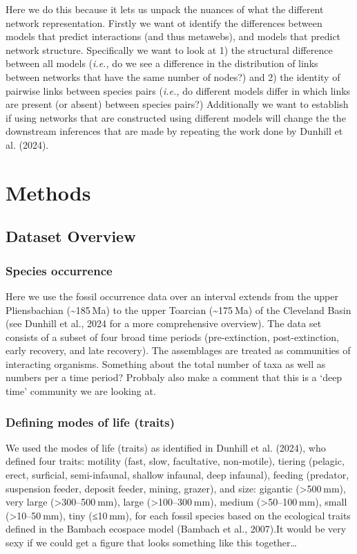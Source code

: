 \documentclass[
]{article}
\begin{document}
Here we do this because it lets us unpack the nuances of what the
different network representation. Firstly we want ot identify the
differences between models that predict interactions (and thus
metawebs), and models that predict network structure. Specifically we
want to look at 1) the structural difference between all models
(\emph{i.e.,} do we see a difference in the distribution of links
between networks that have the same number of nodes?) and 2) the
identity of pairwise links between species pairs (\emph{i.e.,} do
different models differ in which links are present (or absent) between
species pairs?) Additionally we want to establish if using networks that
are constructed using different models will change the the downstream
inferences that are made by repeating the work done by Dunhill et al.
(2024).

\section{Methods}\label{methods}

\subsection{Dataset Overview}\label{dataset-overview}

\subsubsection{Species occurrence}\label{species-occurrence}

Here we use the fossil occurrence data over an interval extends from the
upper Pliensbachian (\textasciitilde185 Ma) to the upper Toarcian
(\textasciitilde175 Ma) of the Cleveland Basin (see Dunhill et al., 2024
for a more comprehensive overview). The data set consists of a subset of
four broad time periods (pre-extinction, post-extinction, early
recovery, and late recovery). The assemblages are treated as communities
of interacting organisms. Something about the total number of taxa as
well as numbers per a time period? Probbaly also make a comment that
this is a `deep time' community we are looking at.

\subsubsection{Defining modes of life
(traits)}\label{defining-modes-of-life-traits}

We used the modes of life (traits) as identified in Dunhill et al.
(2024), who defined four traits: motility (fast, slow, facultative,
non-motile), tiering (pelagic, erect, surficial, semi-infaunal, shallow
infaunal, deep infaunal), feeding (predator, suspension feeder, deposit
feeder, mining, grazer), and size: gigantic (\textgreater500 mm), very
large (\textgreater300--500 mm), large (\textgreater100--300 mm), medium
(\textgreater50--100 mm), small (\textgreater10--50 mm), tiny (≤10 mm),
for each fossil species based on the ecological traits defined in the
Bambach ecospace model (Bambach et al., 2007).It would be very sexy if
we could get a figure that looks something like this together\ldots{}
\end{document}

